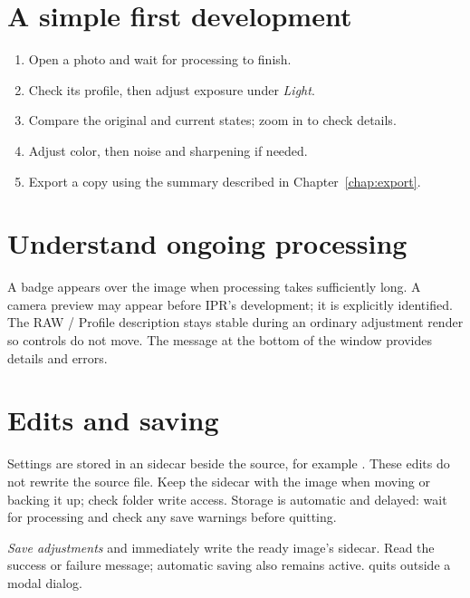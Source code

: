 \section{A simple first development}
\begin{enumerate}
\item Open a photo and wait for processing to finish.
\item Check its profile, then adjust exposure under \emph{Light}.
\item Compare the original and current states; zoom in to check details.
\item Adjust color, then noise and sharpening if needed.
\item Export a copy using the summary described in Chapter~\ref{chap:export}.
\end{enumerate}

\section{Understand ongoing processing}
A badge appears over the image when processing takes sufficiently long.
A camera preview may appear before IPR's development; it is explicitly identified.
The RAW / Profile description stays stable during an ordinary adjustment render
so controls do not move. The message at the bottom of the window provides details
and errors.


\section{Edits and saving}
Settings are stored in an  sidecar beside the source, for example
. These edits do not rewrite the source file. Keep the
sidecar with the image when moving or backing it up; check folder write access.
Storage is automatic and delayed: wait for processing and check any save
warnings before quitting.

\emph{Save adjustments} and  immediately write the ready
image's sidecar. Read the success or failure message; automatic saving also
remains active.  quits outside a modal dialog.

